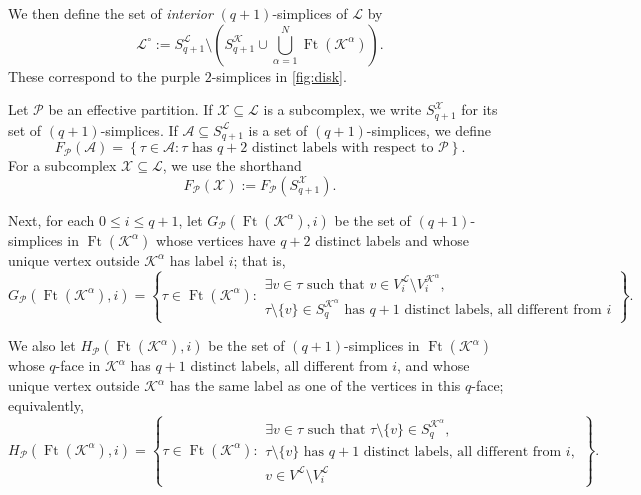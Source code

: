 \documentclass{article}
\newcommand{\KK}{\mathcal{K}}
\newcommand{\LL}{\mathcal{L}}
\newcommand{\Ft}{\operatorname{Ft}}
\begin{document}
We then define the set of \emph{interior} $(q+1)$-simplices of $\LL$ by
\[
\LL^\circ
:=
S_{q+1}^{\LL}
\setminus
\left(
S_{q+1}^{\KK}
\cup
\bigcup_{\alpha=1}^N \Ft(\KK^\alpha)
\right).
\]
These correspond to the purple $2$-simplices in \cref{fig:disk}.

Let $\mathcal P$ be an effective partition. If
$\mathcal X\subseteq \LL$ is a subcomplex, we write
$S_{q+1}^{\mathcal X}$ for its set of $(q+1)$-simplices. If $\mathcal A\subseteq S_{q+1}^{\LL}$ is a set of $(q+1)$-simplices,
we define
\[
F_{\mathcal P}(\mathcal A)
=
\left\{
\tau\in \mathcal A :
\tau \text{ has } q+2 \text{ distinct labels with respect to }
\mathcal P
\right\}.
\]
For a subcomplex $\mathcal X\subseteq \LL$, we use the shorthand
\[
F_{\mathcal P}(\mathcal X):=F_{\mathcal P}(S_{q+1}^{\mathcal X}).
\]

Next, for each $0 \leq i \leq q+1$, let $G_{\mathcal{P}}(\Ft(\KK^\alpha),i)$ be the set of $(q+1)$-simplices in $\Ft(\KK^\alpha)$ whose vertices have $q+2$ distinct labels and whose unique vertex outside $\KK^\alpha$ has label $i$; that is,
\[
G_{\mathcal{P}}(\Ft(\KK^\alpha),i)
=
\left\{
\tau \in \Ft(\KK^\alpha)
:
\begin{array}{l}
\exists v \in \tau \text{ such that } 
v \in V_i^\LL \setminus V_i^{\KK^\alpha}, \\
\tau \setminus \{v\} \in S_q^{\KK^\alpha}
\text{ has } q+1 \text{ distinct labels, all different from } i
\end{array}
\right\}.
\]

We also let $H_{\mathcal{P}}(\Ft(\KK^\alpha),i)$ be the set of $(q+1)$-simplices in $\Ft(\KK^\alpha)$ whose $q$-face in $\KK^\alpha$ has $q+1$ distinct labels, all different from $i$, and whose unique vertex outside $\KK^\alpha$ has the same label as one of the vertices in this $q$-face; equivalently,
\[
H_{\mathcal{P}}(\Ft(\KK^\alpha),i)
=
\left\{
\tau \in \Ft(\KK^\alpha)
:
\begin{array}{l}
\exists v \in \tau \text{ such that }
\tau \setminus \{v\} \in S_q^{\KK^\alpha}, \\
\tau \setminus \{v\}
\text{ has } q+1 \text{ distinct labels, all different from } i, \\
v \in V^\LL \setminus V_i^\LL
\end{array}
\right\}.
\]
\end{document}
